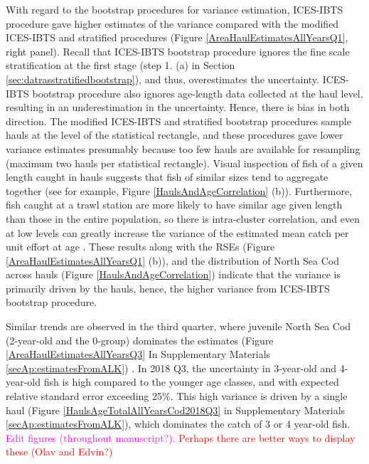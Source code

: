 \documentclass[a4paper 12pt]{article}
\numberwithin{equation}{section}
\newcommand{\ed}[1]{\textcolor{red}{#1}}
\newcommand{\natty}[1]{\textcolor{magenta}{#1}}
\begin{document}
 With regard to the bootstrap procedures for variance estimation, ICES-IBTS procedure gave higher estimates of the variance compared with the modified ICES-IBTS and stratified procedures (Figure \ref{AreaHaulEstimatesAllYearsQ1}, right panel). Recall that  ICES-IBTS bootstrap  procedure ignores the fine scale stratification at the first stage (step 1. (a)  in Section \ref{sec:datrasstratifiedbootstrap}), and thus, overestimates the uncertainty. ICES-IBTS bootstrap procedure also ignores age-length data collected at the haul level, resulting in an underestimation in the uncertainty. Hence, there is bias in both direction. The modified ICES-IBTS and stratified bootstrap procedures sample hauls at the level of the statistical rectangle, and these procedures gave lower variance estimates presumably because too few hauls are available for resampling (maximum two hauls per statistical rectangle).  Visual inspection of fish of a given length caught in hauls suggests that fish of similar sizes tend to aggregate together (see for example, Figure \ref{HaulsAndAgeCorrelation} (b)). Furthermore, fish caught at a trawl station are more likely to have similar age given length than those in the entire population,  so there is intra-cluster correlation, and even at low levels can greatly increase the variance of the estimated mean catch per unit effort at age \citep{pennington1994assessing}. These results along with the RSEs (Figure \ref{AreaHaulEstimatesAllYearsQ1} (b)), and  the distribution of North Sea Cod across hauls (Figure \ref{HaulsAndAgeCorrelation}) indicate that the variance is primarily driven by the hauls, hence, the higher variance from ICES-IBTS bootstrap procedure.
 
Similar trends are observed in the third quarter, where juvenile North Sea Cod (2-year-old and the 0-group) dominates the estimates (Figure \ref{AreaHaulEstimatesAllYearsQ3} In Supplementary Materials \ref{secAp:estimatesFromALK}) . In 2018 Q3, the uncertainty in 3-year-old and 4-year-old fish is high compared to the younger age classes, and with expected relative standard error exceeding 25\%. This high variance is driven by a single haul (Figure \ref{HaulsAgeTotalAllYearsCod2018Q3} in Supplementary Materials \ref{secAp:estimatesFromALK}), which dominates the catch of 3 or 4 year-old fish.  \\

\natty{Edit figures (throughout manuscript?).} \ed{Perhaps there are better ways to display these (Olav and Edvin?)}\\
\end{document}
